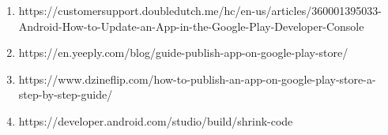 \begin{titlepage}
\begin{enumerate}
        \item https://customersupport.doubledutch.me/hc/en-us/articles/360001395033-Android-How-to-Update-an-App-in-the-Google-Play-Developer-Console

        \item https://en.yeeply.com/blog/guide-publish-app-on-google-play-store/

        \item https://www.dzineflip.com/how-to-publish-an-app-on-google-play-store-a-step-by-step-guide/

        \item https://developer.android.com/studio/build/shrink-code

    \end{enumerate}
\end{titlepage}
